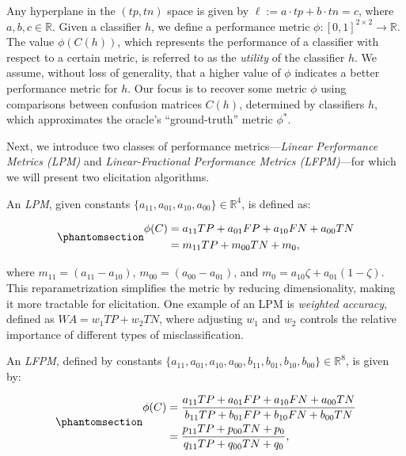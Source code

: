 \documentclass[
  letterpaper,
  numbers=noenddot,
  DIV=11]{scrreprt}
\theoremstyle{definition}
\theoremstyle{plain}
\theoremstyle{plain}
\theoremstyle{remark}
\begin{document}
Any hyperplane in the \((tp, tn)\) space is given by
\(\ell := a \cdot tp + b \cdot tn = c\), where
\(a, b, c \in \mathbb{R}\). Given a classifier \(h\), we define a
performance metric
\(\phi : [0, 1]^{2 \times 2} \rightarrow \mathbb{R}\). The value
\(\phi(C(h))\), which represents the performance of a classifier with
respect to a certain metric, is referred to as the \emph{utility} of the
classifier \(h\). We assume, without loss of generality, that a higher
value of \(\phi\) indicates a better performance metric for \(h\). Our
focus is to recover some metric \(\phi\) using comparisons between
confusion matrices \(C(h)\), determined by classifiers \(h\), which
approximates the oracle's ``ground-truth'' metric \(\phi^*\).

Next, we introduce two classes of performance metrics---\emph{Linear
Performance Metrics (LPM)} and \emph{Linear-Fractional Performance
Metrics (LFPM)}---for which we will present two elicitation algorithms.

An \emph{LPM}, given constants
\(\{a_{11}, a_{01}, a_{10}, a_{00}\} \in \mathbb{R}^{4}\), is defined
as:

\begin{equation}\phantomsection\label{eq-eqlpm}{\begin{aligned}
\phi(C) &= a_{11} TP + a_{01} FP + a_{10} FN + a_{00} TN\\
&= m_{11} TP + m_{00} TN + m_{0},
\end{aligned}}\end{equation}

where \(m_{11} = (a_{11} - a_{10})\), \(m_{00} = (a_{00} - a_{01})\),
and \(m_{0} = a_{10} \zeta + a_{01} (1 - \zeta)\). This
reparametrization simplifies the metric by reducing dimensionality,
making it more tractable for elicitation. One example of an LPM is
\emph{weighted accuracy}, defined as \(WA = w_1TP + w_2TN\), where
adjusting \(w_1\) and \(w_2\) controls the relative importance of
different types of misclassification.

An \emph{LFPM}, defined by constants
\(\{a_{11}, a_{01}, a_{10}, a_{00}, b_{11}, b_{01}, b_{10}, b_{00}\} \in \mathbb{R}^{8}\),
is given by:

\begin{equation}\phantomsection\label{eq-eqlfpm}{\begin{aligned}
\phi(C) &= \frac{a_{11} TP + a_{01} FP + a_{10} FN + a_{00} TN}{b_{11} TP + b_{01} FP + b_{10} FN + b_{00} TN}\\
&= \frac{p_{11} TP + p_{00} TN + p_{0}}{q_{11} TP + q_{00} TN + q_{0}},
\end{aligned}}\end{equation}
\end{document}

